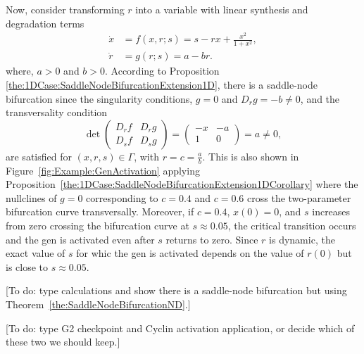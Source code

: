 \documentclass[12pt]{article}
\begin{document}
Now, consider transforming $r$ into a variable with linear synthesis and degradation terms
\begin{equation}
    \begin{aligned}
        \dot x & = f(x,r;s) = s - rx + \frac{x^{2}}{1+x^{2}}, \\
        \dot r & = g(r;s) = a - br.
    \end{aligned}
    \label{equ:Example:GenActivation:2D}
\end{equation}
where, $a>0$ and $b>0$.
According to Proposition \ref{the:1DCase:SaddleNodeBifurcationExtension1D}, there is a saddle-node bifurcation since the singularity conditions, $g=0$ and $D_{r}g=-b\neq 0$, and the transversality condition
\[\det\begin{pmatrix}
            D_{r}f & D_{r}g \\
            D_{s}f & D_{s}g
        \end{pmatrix} = 
        \begin{pmatrix}
            -x & -a\\
            1 & 0
        \end{pmatrix} = a \neq 0,\]
are satisfied for $(x,r,s)\in \Gamma$, with $r=c=\frac{a}{b}$. This is also shown in Figure~\ref{fig:Example:GenActivation} applying Proposition~\ref{the:1DCase:SaddleNodeBifurcationExtension1DCorollary} where the nullclines of $g=0$ corresponding to $c=0.4$ and $c=0.6$ cross the two-parameter bifurcation curve transversally. Moreover, if $c=0.4$, $x(0)=0$, and $s$ increases from zero crossing the bifurcation curve at $s\approx0.05$, the critical transition occurs and the gen is activated even after $s$ returns to zero. Since $r$ is dynamic, the exact value of $s$ for whic the gen is activated depends on the value of $r(0)$ but is close to $s\approx0.05$. 

[To do: type calculations and show there is a saddle-node bifurcation but using Theorem~\ref{the:SaddleNodeBifurcationND}.]

[To do: type G2 checkpoint and Cyclin activation application, or decide which of these two we should keep.]
\end{document}
